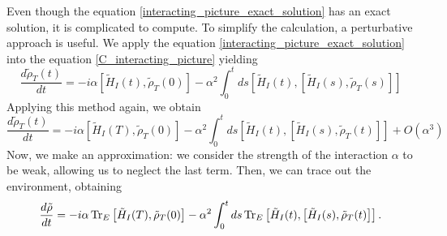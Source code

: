 Even though the equation \eqref{interacting_picture_exact_solution} has an exact solution, it is complicated to compute. To simplify the calculation, a perturbative approach is useful. We apply the equation \eqref{interacting_picture_exact_solution} into the equation \eqref{C_interacting_picture} yielding
\begin{equation}
    \frac{d\tilde\rho_T(t)}{dt}= -i\alpha\left[\tilde H_I(t),\tilde\rho_T(0)\right] -\alpha^2 \int_{0}^{t}ds\left[\tilde H_I(t),\left[\tilde H_I(s),\tilde\rho_T(s)\right]\right]
\end{equation}
Applying this method again, we obtain
\begin{equation}
    \frac{d\tilde\rho_T(t)}{dt}= -i\alpha\left[\tilde H_I(T),\tilde\rho_T(0)\right] -\alpha^2 \int_{0}^{t}ds\left[\tilde H_I(t),\left[\tilde H_I(s),\tilde\rho_T(t)\right]\right] + O(\alpha^3)
\end{equation}
Now, we make an approximation: we consider the strength of the interaction $\alpha$ to be weak, allowing us to neglect the last term.
Then, we can trace out the environment, obtaining
\begin{equation}\label{trace_C_interacting_picture}
    \frac{d\tilde\rho}{dt} = -i\alpha\operatorname{Tr}_E\left[\tilde H_I(T),\tilde\rho_T(0)\right] -\alpha^2 \int_{0}^{t}ds \operatorname{Tr}_E\left[\tilde H_I(t),\left[\tilde H_I(s),\tilde\rho_T(t)\right]\right].
\end{equation}

